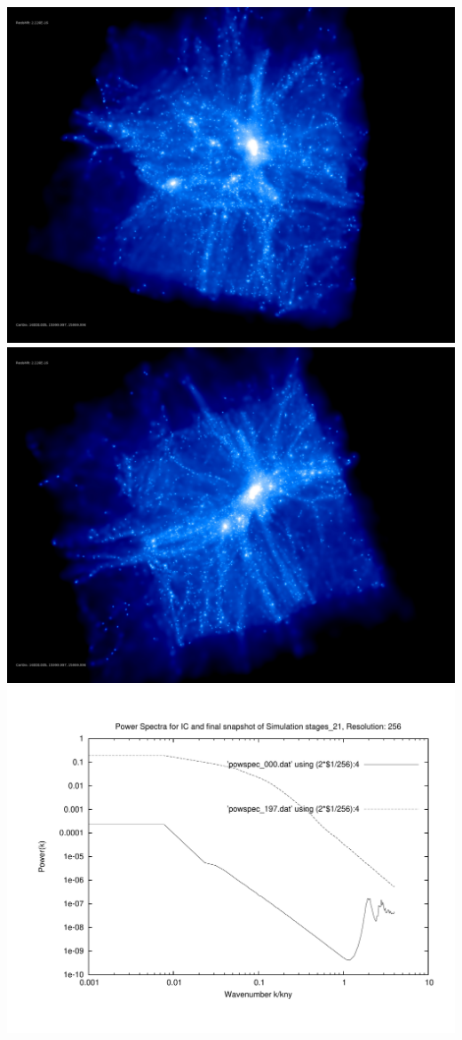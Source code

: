 \includegraphics[scale=0.1]{r256/h100/stages_21/rotate_00074.jpg} 
\includegraphics[scale=0.1]{r256/h100/stages_21/rotate_00131.jpg}  \\

\includegraphics[scale=0.5]{r256/h100/stages_21/plot_powspec_stages_21}

